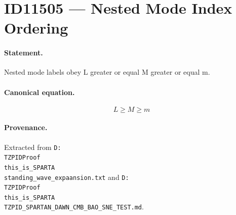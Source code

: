 \section*{ID11505 --- Nested Mode Index Ordering}

\paragraph{Statement.}
Nested mode labels obey L greater or equal M greater or equal m.

\paragraph{Canonical equation.}
\[
L\ge M\ge m
\]

\paragraph{Provenance.}
Extracted from \texttt{D:\\TZPIDProof\\this\_is\_SPARTA\\standing\_wave\_expaansion.txt} and \texttt{D:\\TZPIDProof\\this\_is\_SPARTA\\TZPID\_SPARTAN\_DAWN\_CMB\_BAO\_SNE\_TEST.md}.
